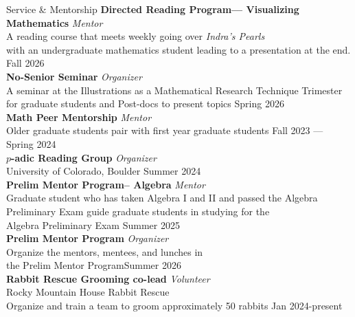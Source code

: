 \documentclass{resume} %
\begin{document}
\newpage
\begin{rSection}{Service \& Mentorship}
{\bf Directed Reading Program–– Visualizing Mathematics} \hfill \textit{Mentor} \\
A reading course that meets weekly going over \textit{Indra's Pearls}\\ with an undergraduate mathematics student leading to a presentation at the end. \hfill Fall 2026 \\

{\bf No-Senior Seminar} \hfill \textit{Organizer} \\
A seminar at the Illustrations as a Mathematical Research Technique Trimester\\ for graduate students and Post-docs to present topics  \hfill Spring 2026 \\

{\bf Math Peer Mentorship} \hfill \textit{Mentor} \\
Older graduate students pair with first year graduate students  \hfill Fall 2023 --- Spring 2024 \\

{\bf $p$-adic Reading Group}  \hfill \textit{Organizer}\\
University of Colorado, Boulder \hfill Summer 2024\\

{\bf Prelim Mentor Program-- Algebra} \hfill \textit{Mentor} \\
Graduate student who has taken Algebra I and II 
and passed the Algebra \\Preliminary Exam guide graduate students in studying for the \\Algebra Preliminary Exam \hfill Summer 2025 \\

{\bf Prelim Mentor Program} \hfill \textit{Organizer} \\
Organize the mentors, mentees, and lunches in \\ the Prelim Mentor Program\hfill Summer 2026 \\

{\bf Rabbit Rescue Grooming co-lead} \hfill \textit{Volunteer} \\
Rocky Mountain House Rabbit Rescue\\
Organize and train a team to groom approximately 50 rabbits \hfill Jan 2024-present \\

\small
\end{rSection}
\end{document}
